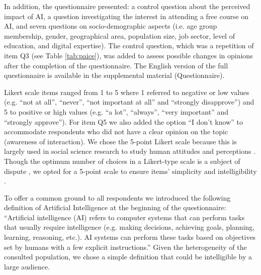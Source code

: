 \documentclass{article}
\begin{document}
In addition, the questionnaire presented: a control question about the perceived impact of AI, a question investigating the interest in attending a free course on AI, and seven questions on socio-demographic aspects (i.e. age group membership, gender, geographical area, population size, job sector, level of education, and digital expertise). The control question, which was a repetition of item Q3 (see Table \ref{tab:paice}), was added to assess possible changes in opinions after the completion of the questionnaire. The English version of the full questionnaire is available in the supplemental material (Questionnaire). 

Likert scale items ranged from 1 to 5 where 1 referred to negative or low values (e.g. ``not at all'', ``never'', ``not important at all'' and ``strongly disapprove'') and 5 to positive or high values (e.g. ``a lot'', ``always'', ``very important'' and ``strongly approve''). For item Q5 we also added the option ``I don't know'' to accommodate respondents who did not have a clear opinion on the topic (awareness of interaction). 
We chose the 5-point Likert scale because this is largely used in social science research to study human attitudes and perceptions \cite{nunnally1994}. Though the optimum number of choices in a Likert-type scale is a subject of dispute \cite{joshi2015}, we opted for a 5-point scale to ensure items' simplicity and  intelligibility \cite{Likert, Biasutti2017}. 

To offer a common ground to all respondents we introduced the following definition of Artificial Intelligence at the beginning of the questionnaire: ``Artificial intelligence (AI) refers to computer systems that can perform tasks that usually require intelligence (e.g. making decisions, achieving goals, planning, learning, reasoning, etc.). AI systems can perform these tasks based on objectives set by humans with a few explicit instructions.'' Given the heterogeneity of the consulted population, we chose a simple definition that could be intelligible by a large audience.
\end{document}
